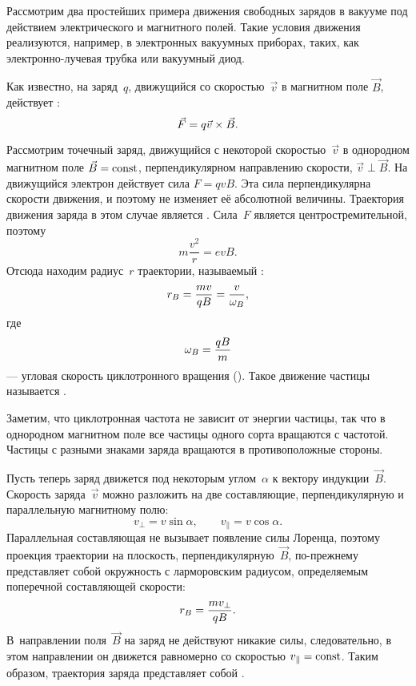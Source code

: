 
Рассмотрим два простейших примера движения свободных зарядов в вакууме под
действием электрического и магнитного полей. Такие условия движения реализуются,
например, в электронных вакуумных приборах, таких, как электронно-лучевая
трубка или вакуумный диод.



Как известно, на заряд~$q$, движущийся со скоростью~$\vec{v}$ в магнитном поле
$\vec{B}$, действует :
\begin{equation*}
    \eqmark{3.1}
    \vec{F}=q{\vec{v}}\times{\vec{B}}.
\end{equation*}

Рассмотрим точечный заряд, движущийся с некоторой скоростью~$\vec{v}$ в
однородном магнитном поле $\vec{B}=\mathrm{const}$, перпендикулярном направлению
скорости, $\vec{v}\perp \vec{B}$. На движущийся электрон действует сила
$F=qvB$. Эта сила перпендикулярна скорости движения, и поэтому не изменяет её
абсолютной величины. Траектория движения заряда в этом случае является
. Сила~$F$ является центростремительной, поэтому
\[
m\frac{v^2}{r}=evB.
\]
Отсюда находим радиус~$r$ траектории, называемый :
\begin{equation}
    \eqmark{3.2}
    r_B =\frac{m v}{qB}= \frac{v}{\omega_B},
\end{equation}
где
\begin{equation}
    \eqmark{omega-B}
    \omega_B=\frac{qB}{m}
\end{equation}
--- угловая скорость циклотронного вращения ().
Такое движение частицы называется .

Заметим, что циклотронная частота не зависит от энергии частицы, так
что в однородном магнитном поле все частицы одного сорта вращаются с
 частотой. Частицы с разными знаками заряда вращаются в
противоположные стороны.

Пусть теперь заряд движется под некоторым углом~$\alpha$ к вектору
индукции~$\vec{B}$. Скорость заряда~$\vec{v}$ можно разложить
на две составляющие, перпендикулярную и параллельную магнитному полю:
\begin{equation*}
    v_{\perp}=v\sin\alpha,\qquad v_{\parallel}=v\cos\alpha.
\end{equation*}
Параллельная составляющая не вызывает появление силы Лоренца, поэтому
проекция траектории на плоскость, перпендикулярную~$\vec{B}$,
по-прежнему представляет собой окружность с ларморовским радиусом,
определяемым поперечной составляющей скорости:
\begin{equation}
    \eqmark{3.4}
    r_B =\frac{m v_{\perp}}{qB}.
\end{equation}
В~направлении поля~$\vec{B}$ на заряд не действуют никакие силы,
следовательно, в этом направлении он движется равномерно со скоростью
$v_{\parallel}=\mathrm{const}$. Таким образом, траектория заряда представляет собой
.

